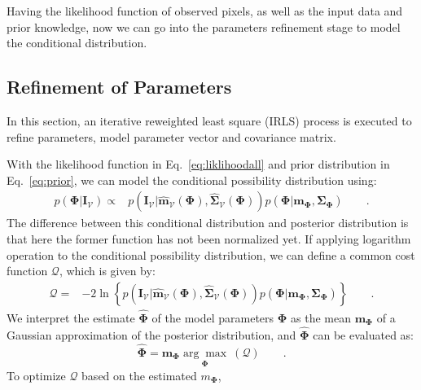 \documentclass[conference]{IEEEtran}
\begin{document}
Having the likelihood function of observed pixels, as well as
the input data and prior knowledge, now we can go into the parameters
refinement stage to model the conditional distribution.

\subsection{Refinement of  Parameters}
\label{sec:ref}
In this section, an iterative reweighted least square (IRLS) process
is executed to refine parameters, model parameter vector and covariance matrix.

With the likelihood function in Eq.~\ref{eq:liklihoodall} and prior distribution in
Eq.~\ref{eq:prior}, we can model the conditional possibility distribution using:
\begin{align}
\label{eq:costf}
    p(\mathbf{\Phi}|\mathbf{\mathbf{I}}_{\mathcal{V}}) 
    \propto &
    p(\mathbf{\mathbf{I}_{\mathcal{V}}}
    |\hat{\mathbf{\mathbf{m}}}_{\mathcal{V}}(\mathbf{\Phi}),\hat{\mathbf{\mathbf{\Sigma}}}_{\mathcal{V}}(\mathbf{\Phi}))p(\mathbf{\Phi}
    | \mathbf{m}_{\mathbf{\Phi}},
    \mathbf{\mathbf{\Sigma}}_{\mathbf{\Phi}})\qquad.
\end{align}
The difference between this conditional distribution and posterior
distribution is that here the former function has not been normalized yet.
If applying logarithm operation to the conditional possibility
distribution, we can define a common cost function $\mathcal{Q}$,
which is given by:
\begin{align}
  \label{eq:costd}
  \mathcal{Q} = & -2 \ln \left\{  p(\mathbf{\mathbf{I}_{\mathcal{V}}}
    |\hat{\mathbf{\mathbf{m}}}_{\mathcal{V}}(\mathbf{\Phi}),\hat{\mathbf{\mathbf{\Sigma}}}_{\mathcal{V}}(\mathbf{\Phi}))p(\mathbf{\Phi}
    | \mathbf{m}_{\mathbf{\Phi}},
    \mathbf{\mathbf{\Sigma}}_{\mathbf{\Phi}})\right\}\qquad.
\end{align}
We interpret the estimate $\hat{\mathbf{\Phi}}$ of the model
parameters $\mathbf{\Phi}$ as  the mean $\mathbf{m}_{\mathbf{\Phi}}$ of a Gaussian
approximation of the posterior distribution, and
$\hat{\mathbf{\Phi}}$ can be evaluated as:
\begin{equation}
  \label{eq:maxcost}
  \hat{\mathbf{\Phi}} =
  \mathbf{m}_{\mathbf{\Phi}}\underset{\mathbf{\Phi}}{\arg\max} \
  (\mathcal{Q}) \qquad.
\end{equation}
To optimize $\mathcal{Q}$ based on the estimated $m_{\mathbf{\Phi}}$,
\end{document}
